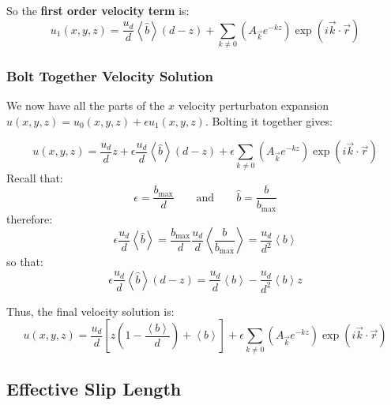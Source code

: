 \documentclass[a4paper]{report}
\newcommand{\bmax}{\ensuremath{b_{\mathrm{max}}}}
\begin{document}
\vspace{1em}
So the \textbf{first order velocity term} is:
\begin{equation}
u_1(x,y,z) =  \frac{u_d}{d} \left< \hat{b} \right> (d - z)
 + \sum_{k \neq 0} 
\left(  A_{\vec{k}} e^{-kz} \right)
\exp(i \vec{k}\cdot \vec{r})
\end{equation}

\subsubsection*{Bolt Together Velocity Solution}
We now have all the parts of the $x$ velocity perturbaton expansion $u(x,y,z) = u_0(x,y,z) + \epsilon u_1(x,y,z)$.  Bolting it together gives:

\begin{equation}
u(x,y,z) = \frac{u_d}{d} z
 + \epsilon \frac{u_d}{d} \left< \hat{b} \right> (d - z)
 +  \epsilon \sum_{k \neq 0} 
\left(  A_{\vec{k}} e^{-kz} \right)
\exp(i \vec{k}\cdot \vec{r})
\end{equation}
Recall that:
\begin{equation}
\epsilon = \frac{\bmax}{d} \qquad \text{and} \qquad
\hat{b} = \frac{b}{\bmax}
\end{equation}
therefore:
\begin{equation}
\epsilon \frac{u_d}{d} \left< \hat{b} \right> 
= \frac{\bmax}{d} \frac{u_d}{d} \left< \frac{b}{\bmax} \right> 
= \frac{u_d}{d^2} \left< b \right>
\end{equation}
so that:
\begin{equation}
\epsilon \frac{u_d}{d} \left< \hat{b} \right> (d - z)
= \frac{u_d}{d} \left< b \right> - \frac{u_d}{d^2} \left< b \right> z
\end{equation}


Thus, the final velocity solution is:
\begin{equation}
u(x,y,z) = \frac{u_d}{d} 
\left[ z \left( 1 - \frac{\left< b \right>}{d} \right) + \left< b \right> \right]
 +  \epsilon \sum_{k \neq 0} 
\left(  A_{\vec{k}} e^{-kz} \right)
\exp(i \vec{k}\cdot \vec{r})
\end{equation}



\subsection*{Effective Slip Length}
\end{document}
